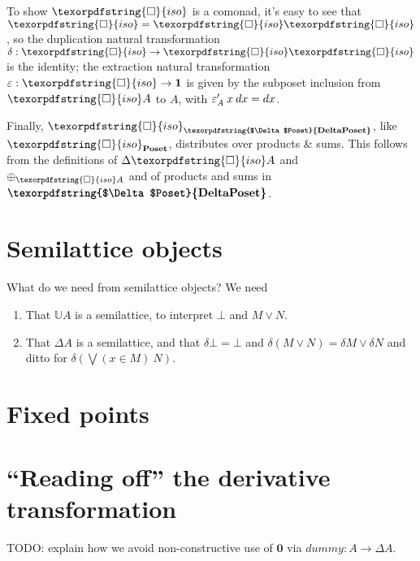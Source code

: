 \documentclass{rntz}\usepackage[a5]{rntzgeometry}\usepackage[fullwidth=13cm,width=315pt]{narrow}
\newcommand\mathvar[1]{\ensuremath{#1}} %
\newcommand\<{\mskip 4mu plus 4mu minus 1mu}
\newcommand\dx{\mathvar{dx}}
\newcommand\todo[1]{{\color{Rhodamine}#1}}
\newcommand\cat\textbf
\newcommand\CP{\cat{\texorpdfstring{$\Delta$Poset}{DeltaPoset}}}
\newcommand\Poset{\cat{Poset}}
\newcommand\D\Delta
\newcommand\zero{\ensuremath{\mathbold{0}}}
\newcommand\iso{\texorpdfstring{\ensuremath{\square}}{iso}}
\newcommand\isof{\iso}
\newcommand\fname[1]{\textit{#1}}
\newcommand\valfn{\ensuremath{\mathbb{U}}}
\newcommand\vals{\valfn}
\newcommand\chgs[1]{\D{#1}}
\newcommand\deriv[1]{\ensuremath{#1'}}
\newcommand\upd{\mathbin{\oplus}}
\newcommand\updfn{\ensuremath{{\upd}}}
\begin{document}
\noindent
To show $\iso$ is a comonad, it's easy to see that ${\iso} = {\iso\iso}$, so the
duplication natural transformation $\delta : {\iso} \to {\iso\iso}$ is the
identity; the extraction natural transformation $\varepsilon : {\iso} \to
\mathbold{1}$ is given by the subposet inclusion from $\isof A$ to $A$, with
$\deriv{\varepsilon_A} \<x \<\dx = \dx$.

Finally, $\iso_\CP$, like $\iso_\Poset$, distributes over products \& sums. This
follows from the definitions of $\chgs{\iso A}$ and $\updfn_{\iso A}$ and of
products and sums in $\CP$.


\section{Semilattice objects}

\todo{What do we need from semilattice objects? We need
  \begin{enumerate}
  \item That $\vals A$ is a semilattice, to interpret $\bot$ and $M \vee N$.
  \item That $\chgs A$ is a semilattice, and that $\delta\bot = \bot$ and
    $\delta(M \vee N) = \delta M \vee \delta N$ and ditto for $\delta(\bigvee(x
    \in M)~N)$.
  \end{enumerate}
}


\section{Fixed points}


\section{``Reading off'' the derivative transformation}
\label{sec:derivative-transform}

\todo{TODO: explain how we avoid non-constructive use of $\zero$ via
  $\fname{dummy} : A \to \chgs A$.}
\end{document}
